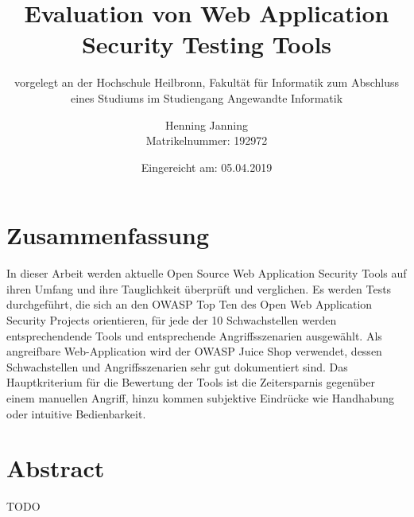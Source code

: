 \documentclass[12pt,oneside,a4paper,parskip]{scrbook}
\def\BaAuthor{Henning Janning}
\def\BaTitle{Evaluation von Web Application Security Testing Tools}
\def\BaSupervisorOne{Prof. Andreas Mayer}
\def\BaSupervisorTwo{Susanne Steuer (M.Sc.) }
\def\BaDeadline{05.04.2019}
\def\MatNr{192972}
\begin{document}


\frontmatter
\titlehead{%
  {Hochschule Heilbronn\\
   Fakultät für Informatik}}
\subject{Bachelorarbeit}
\title{\BaTitle\\[15mm]}
\subtitle{\normalsize{vorgelegt an der Hochschule Heilbronn, Fakultät für Informatik zum Abschluss eines Studiums im Studiengang Angewandte Informatik}}
\author{\BaAuthor\\
\normalsize{Matrikelnummer: \MatNr}}
\date{\normalsize{Eingereicht am: \BaDeadline}}
\publishers{
  \normalsize{Erstpr\"{u}fer: \BaSupervisorOne}\\
  \normalsize{Zweitpr\"{u}ferin: \BaSupervisorTwo}\\
}


\maketitle



\section*{Zusammenfassung}

In dieser Arbeit werden aktuelle Open Source Web Application Security Tools auf ihren Umfang und ihre Tauglichkeit überprüft und verglichen.
Es werden Tests durchgeführt, die sich an den OWASP Top Ten des Open Web Application Security Projects orientieren, für jede der 10 Schwachstellen werden entsprechendende Tools und entsprechende Angriffsszenarien ausgewählt.
Als angreifbare Web-Application wird der OWASP Juice Shop verwendet, dessen Schwachstellen und Angriffsszenarien sehr gut dokumentiert sind.
Das Hauptkriterium für die Bewertung der Tools ist die Zeitersparnis gegenüber einem manuellen Angriff, hinzu kommen subjektive Eindrücke wie Handhabung oder intuitive Bedienbarkeit.


\section*{Abstract}

TODO


\setcounter{secnumdepth}{3}
\setcounter{tocdepth}{3}
\tableofcontents


\mainmatter
\end{document}
